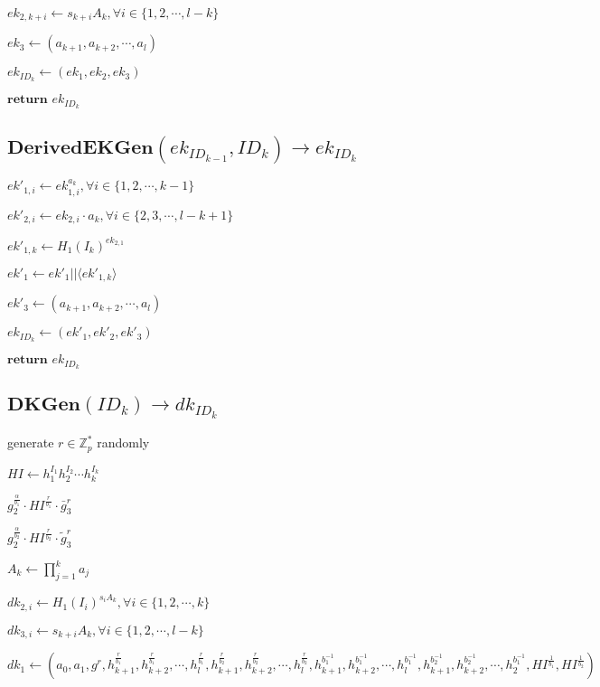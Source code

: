 \documentclass[a4paper]{article}
\begin{document}
$\textit{ek}_{2, k + i} \gets s_{k + i}A_k, \forall i \in \{1, 2, \cdots, l - k\}$

$\textit{ek}_3 \gets (a_{k + 1}, a_{k + 2}, \cdots, a_l)$

$\textit{ek}_{\textit{ID}_k} \gets (\textit{ek}_1, \textit{ek}_2, \textit{ek}_3)$

$\textbf{return }\textit{ek}_{\textit{ID}_k}$

\subsection{$\textbf{DerivedEKGen}(\textit{ek}_{\textit{ID}_{k - 1}}, \textit{ID}_k) \rightarrow \textit{ek}_{\textit{ID}_k}$}

$\textit{ek}'_{1, i} \gets \textit{ek}_{1, i}^{a_k}, \forall i \in \{1, 2, \cdots, k - 1\}$

$\textit{ek}'_{2, i} \gets \textit{ek}_{2, i} \cdot a_k, \forall i \in \{2, 3, \cdots, l - k + 1\}$

$\textit{ek}'_{1, k} \gets H_1(I_k)^{\textit{ek}_{2, 1}}$

$\textit{ek}'_1 \gets \textit{ek}'_1 || \langle\textit{ek}'_{1, k}\rangle$

$\textit{ek}'_3 \gets (a_{k + 1}, a_{k + 2}, \cdots, a_l)$

$\textit{ek}_{\textit{ID}_k} \gets (\textit{ek}'_1, \textit{ek}'_2, \textit{ek}'_3)$

$\textbf{return }\textit{ek}_{\textit{ID}_k}$

\subsection{$\textbf{DKGen}(\textit{ID}_k) \rightarrow \textit{dk}_{\textit{ID}_k}$}

generate $r \in \mathbb{Z}_p^*$ randomly

$\textit{HI} \gets h_1^{I_1} h_2^{I_2} \cdots h_k^{I_k}$

$g_2^{\frac{\alpha}{b_1}} \cdot \textit{HI}^{\frac{r}{b_1}} \cdot \bar{g}_3^r$

$g_2^{\frac{\alpha}{b_2}} \cdot \textit{HI}^{\frac{r}{b_2}} \cdot \tilde{g}_3^r$

$A_k \gets \prod\limits_{j = 1}^k a_j$

$\textit{dk}_{2, i} \gets H_1(I_i)^{s_iA_k}, \forall i \in \{1, 2, \cdots, k\}$

$\textit{dk}_{3, i} \gets s_{k + i}A_k, \forall i \in \{1, 2, \cdots, l - k\}$

$\textit{dk}_1 \gets (
a_0, a_1, g^r,
h_{k + 1}^{\frac{r}{b_1}}, h_{k + 2}^{\frac{r}{b_1}}, \cdots, h_l^{\frac{r}{b_1}},
h_{k + 1}^{\frac{r}{b_2}}, h_{k + 2}^{\frac{r}{b_2}}, \cdots, h_l^{\frac{r}{b_2}},
h_{k + 1}^{b_1^{-1}}, h_{k + 2}^{b_1^{-1}}, \cdots, h_l^{b_1^{-1}},
h_{k + 1}^{b_2^{-1}}, h_{k + 2}^{b_2^{-1}}, \cdots, h_2^{b_1^{-1}},
\textit{HI}^{\frac{1}{b_1}}, \textit{HI}^{\frac{1}{b_2}}
)$
\end{document}
